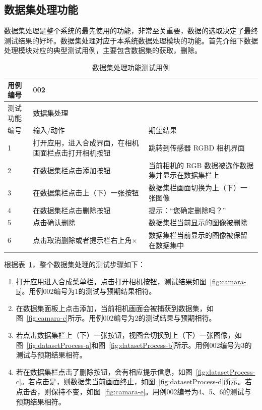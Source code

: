 \subsection{数据集处理功能}
数据集处理是整个系统的最先使用的功能，非常至关重要，数据的选取决定了最终测试结果的好坏。数据集处理对应于本系统数据处理模块的功能。首先介绍下数据处理模块对应的典型测试用例，主要包含数据集的获取，删除。

\begin{table}[t]
  \centering
  \small{}\setlength{}
  \caption{数据集处理功能测试用例}
  \begin{tabular}{|p{2cm}<{\centering}|p{4cm}<{\centering}|p{4cm}<{\centering}|}
    \hline
    用例编号 & \multicolumn{2}{|l|}{002}       \\
    \hline
    测试功能 & \multicolumn{2}{|l|}{数据集处理}       \\
    \hline
    编号 & 输入/动作 & 期望结果 \\
    \hline
    1 & 打开应用，进入合成界面，在相机画面栏点击打开相机按钮 & 跳转到传感器 RGBD 相机界面 \\
    \hline
    2 & 在数据集栏点击添加按钮 & 当前相机的 RGB 数据被选作数据集并显示在数据集栏上 \\
    \hline
    3 & 在数据集栏点击上（下）一张按钮 & 数据集栏画面切换为上（下）一张图像 \\
    \hline
    4 & 在数据集栏点击删除按钮 & 提示：“您确定删除吗？” \\
    \hline
    5 & 点击确认删除 & 数据集栏当前显示的图像被删除 \\
    \hline
    6 & 点击取消删除或者提示栏右上角$\times$ & 数据集栏当前显示的图像被保留在数据集中 \\
    \hline
  \end{tabular}
  \label{tab:getdataset}
\end{table}

根据表~\ref{tab:getdataset}，整个数据集处理的测试步骤如下：
\begin{enumerate}
    \item[1)] 打开应用进入合成菜单栏，点击打开相机按钮，测试结果如图~\ref{fig:camara-b}。用例002编号为1的测试与预期结果相符。
    \item[2)] 在数据集面板上点击添加，当前相机画面会被捕获到数据集，如图~\ref{fig:camara-c}所示。用例002编号为2的测试结果与预期相符。
    \item[3)] 若点击数据集栏上（下）一张按钮，视图会切换到上（下）一张图像，如图~\ref{fig:datasetProcess-a}和图~\ref{fig:datasetProcess-b}所示。用例002编号为3的测试与预期结果相符。
    \item[4)] 若在数据集栏点击了删除按钮，会有相应提示信息，如图~\ref{fig:datasetProcess-c}。若点击是，则数据集当前画面终止，如图~\ref{fig:datasetProcess-d}所示。若点击否，则保持不变，如图~\ref{fig:camara-e}。用例002编号为4、5、6的测试与预期结果相符。
\end{enumerate}

